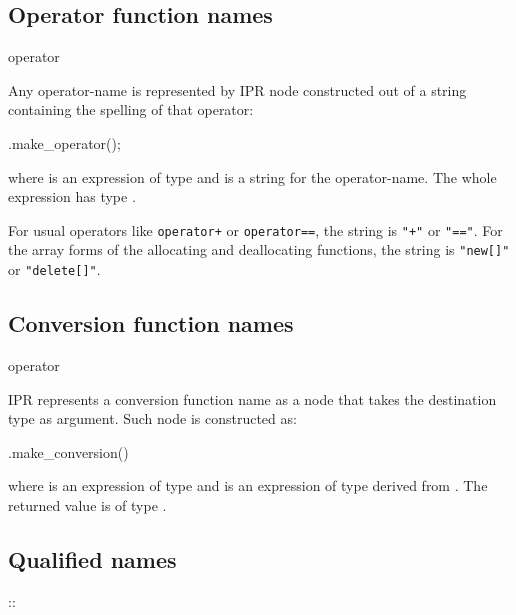 \documentclass[11pt]{article}
\begin{document}
\subsection{Operator function names}
\label{sec:name.operator}
\begin{Grammar}
     operator 
\end{Grammar}
Any operator-name is represented by IPR node constructed out of a string
containing the spelling of that operator:
\begin{Program}
  .make_operator();
\end{Program}
where  is an expression of type  and 
is a string for the operator-name.  The whole expression has type
.

For usual operators like \texttt{operator+} or \texttt{operator==}, the string
is \texttt{"+"} or \texttt{"=="}.  For the array forms of the allocating and
deallocating functions, the string is \texttt{"new[]"} or \texttt{"delete[]"}.


\subsection{Conversion function names}
\label{sec:name.conversion}
\begin{Grammar}
     operator 
\end{Grammar}

IPR represents a conversion function name as a node that takes the destination
type as argument.  Such node is constructed as:
\begin{Program}
  .make_conversion()
\end{Program}
where  is an expression of type  and 
is an expression of type derived from .  The returned value is
of type .


\subsection{Qualified names}
\label{sec:name.qualified}
\begin{Grammar}
     \cxxOpt{::}  
     {::} 
\end{Grammar}
\end{document}
